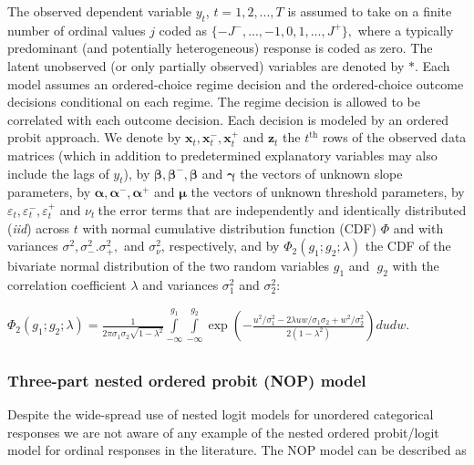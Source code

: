 \documentclass[letterpaper,fleqn,12pt]{article}
\begin{document}
\begin{onehalfspace}
The observed dependent variable $y_{t}$, $t=1,2,...,T$ is assumed to take on
a finite number of ordinal values $j$ coded as $%
\{-J^{-},...,-1,0,1,...,J^{+}\},$ where a typically predominant (and
potentially heterogeneous) response is coded as zero. The latent unobserved
(or only partially observed) variables are denoted by $\ast $. Each model
assumes an ordered-choice regime decision and the ordered-choice outcome
decisions conditional on each regime. The regime decision is allowed to be
correlated with each outcome decision. Each decision is modeled by an
ordered probit approach. We denote by $\mathbf{x}_{t},\mathbf{x}_{t}^{-},%
\mathbf{x}_{t}^{+}$ and $\mathbf{z}_{t}$ the $t^{\text{th}}$ rows of the
observed data matrices (which in addition to predetermined explanatory
variables may also include the lags of $y_{t}$), by $\mathbf{\beta ,\beta }%
^{-},\mathbf{\beta }$ and $\mathbf{\gamma }$ the vectors of unknown slope
parameters, by $\mathbf{\alpha ,\alpha }^{-}\mathbf{,\alpha }^{+}$ and $%
\mathbf{\mu }$ the vectors of unknown threshold parameters, by $\varepsilon
_{t},\varepsilon _{t}^{-},\varepsilon _{t}^{+}$ and $\nu _{t}\ $the error
terms that are independently and identically distributed (\textit{iid})
across $t$ with normal cumulative distribution function (CDF) $\Phi $ and
with variances $\sigma ^{2},\sigma _{-}^{2}.\sigma _{+}^{2},$ and $\sigma
_{\nu }^{2}$, respectively, and by $\Phi _{2}(g_{1}\mathbf{;}g_{2}\mathbf{;}%
\lambda )$ the CDF of the bivariate normal distribution of the two random
variables $g_{1}$ and\textbf{\ }$g_{2}$ with the correlation coefficient $%
\lambda $ and variances $\sigma _{1}^{2}$ and $\sigma _{2}^{2}$:

\begin{center}
$\Phi _{2}(g_{1}\mathbf{;}g_{2}\mathbf{;}\lambda )=\frac{1}{2\pi \sigma
_{1}\sigma _{2}\sqrt{1-\lambda ^{2}}}\underset{}{\underset{-\infty }{\overset%
{g_{1}}{\int }}}\underset{-\infty }{\overset{g_{2}}{\int }}\exp \left( -%
\frac{u^{2}/\sigma _{1}^{2}-2\lambda uw/\sigma _{1}\sigma _{2}+w^{2}/\sigma
_{2}^{2}}{2(1-\lambda ^{2})}\right) dudw.$
\end{center}

\subsubsection*{Three-part nested ordered probit (NOP) model}

Despite the wide-spread use of nested logit models for unordered categorical
responses we are not aware of any example of the nested ordered probit/logit
model for ordinal responses in the literature. The NOP model can be
described as


\end{onehalfspace}
\end{document}
